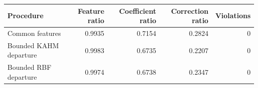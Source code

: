 \begin{tabular}{@{}lrrrr@{}}
\toprule
Procedure & Feature ratio & Coefficient ratio & Correction ratio & Violations \\
\midrule
Common features & 0.9935 & 0.7154 & 0.2824 & 0 \\
Bounded KAHM departure & 0.9983 & 0.6735 & 0.2207 & 0 \\
Bounded RBF departure & 0.9974 & 0.6738 & 0.2347 & 0 \\
\bottomrule
\end{tabular}
